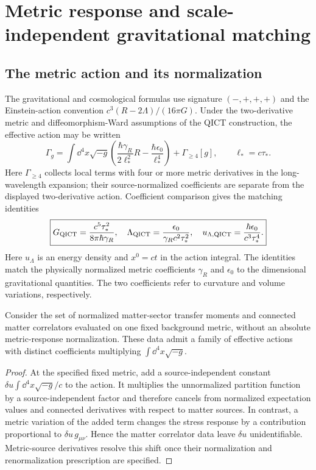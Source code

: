 \section{Metric response and scale-independent gravitational matching}\label{sec:metric}
\subsection{The metric action and its normalization}

The gravitational and cosmological formulas use signature $(-,+,+,+)$ and the Einstein-action convention $c^3(R-2\Lambda)/(16\pi G)$. Under the two-derivative metric and diffeomorphism-Ward assumptions of the QICT construction, the effective action may be written
\begin{equation}
\Gamma_g=\int \dd^4x\sqrt{-g}\left(\frac{\hbar\gamma_R}{2\ell_*^2}R-\frac{\hbar\epsilon_0}{\ell_*^4}\right)+\Gamma_{\geq4}[g],\qquad \ell_*=c\tau_*.
\end{equation}
Here $\Gamma_{\geq4}$ collects local terms with four or more metric derivatives in the long-wavelength expansion; their source-normalized coefficients are separate from the displayed two-derivative action. Coefficient comparison gives the matching identities
\begin{equation}\label{eq:matching}
\boxed{G_{\rm QICT}=\frac{c^5\tau_*^2}{8\pi\hbar\gamma_R},\quad
\Lambda_{\rm QICT}=\frac{\epsilon_0}{\gamma_Rc^2\tau_*^2},\quad
u_{\Lambda,\rm QICT}=\frac{\hbar\epsilon_0}{c^3\tau_*^4}.}
\end{equation}
Here $u_\Lambda$ is an energy density and $x^0=ct$ in the action integral. The identities match the physically normalized metric coefficients $\gamma_R$ and $\epsilon_0$ to the dimensional gravitational quantities. The two coefficients refer to curvature and volume variations, respectively.

\begin{proposition}
Consider the set of normalized matter-sector transfer moments and connected matter correlators evaluated on one fixed background metric, without an absolute metric-response normalization. These data admit a family of effective actions with distinct coefficients multiplying $\int\dd^4x\sqrt{-g}$.
\end{proposition}
\begin{proof}
At the specified fixed metric, add a source-independent constant $\delta u\int\dd^4x\sqrt{-g}/c$ to the action. It multiplies the unnormalized partition function by a source-independent factor and therefore cancels from normalized expectation values and connected derivatives with respect to matter sources. In contrast, a metric variation of the added term changes the stress response by a contribution proportional to $\delta u\,g_{\mu\nu}$. Hence the matter correlator data leave $\delta u$ unidentifiable. Metric-source derivatives resolve this shift once their normalization and renormalization prescription are specified.
\end{proof}

